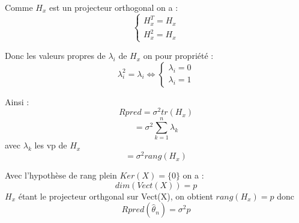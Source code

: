 Comme $H_x$ est un projecteur orthogonal on a :
\smallbreak
$$
\begin{cases}
    H_x^T = H_x  \\
    H_x^2 = H_x
\end{cases} $$

Donc les valeurs propres de $\lambda_i$ de $H_x$ on pour propriété : 
$$\lambda_i^2 = \lambda_i \Longleftrightarrow 
\begin{cases}
    \lambda_i = 0  \\
    \lambda_i = 1
\end{cases} $$

Ainsi : 
$$ Rpred = \sigma^2 tr(H_x)$$
$$ = \sigma^2 \sum^n_{k=1} \lambda_k$$ avec $\lambda_k$ les vp de $H_x$
$$ = \sigma^2 rang(H_x)$$

Avec l'hypothèse de rang plein $Ker(X) = \{0\}$ on a :
$$dim(Vect(X)) = p$$
$H_x$ étant le projecteur orthgonal sur Vect(X), on obtient $rang(H_x) = p$
donc 
$$Rpred(\hat{\theta}_n) = \sigma^2 p$$




